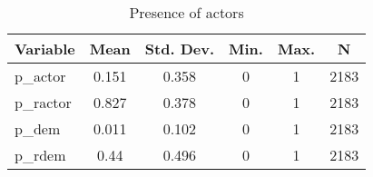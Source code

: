 
\begin{table}[htbp]\centering \caption{Presence of actors \label{sumstat}}
\begin{tabular}{l c c c c c}\hline\hline
\multicolumn{1}{c}{\textbf{Variable}} & \textbf{Mean}
 & \textbf{Std. Dev.}& \textbf{Min.} &  \textbf{Max.} & \textbf{N}\\ \hline
p\_actor & 0.151 & 0.358 & 0 & 1 & 2183\\
p\_ractor & 0.827 & 0.378 & 0 & 1 & 2183\\
p\_dem & 0.011 & 0.102 & 0 & 1 & 2183\\
p\_rdem & 0.44 & 0.496 & 0 & 1 & 2183\\
\hline\end{tabular}
\end{table}
